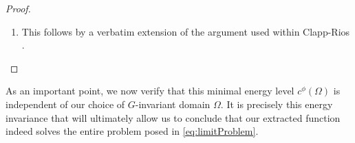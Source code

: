 \documentclass[10pt, reqno]{amsart}
\newcommand{\Om}{\Omega}
\newcommand{\abs}[1]{\left\vert #1 \right\vert}
\newcommand{\norm}[1]{\left\Vert #1 \right\Vert}
\newcommand{\D}{\mathcal{D}}
\numberwithin{equation}{section}
\theoremstyle{definition}
\theoremstyle{remark}
\theoremstyle{plain}
\begin{document}
\begin{proof}
\begin{enumerate}[leftmargin=*]
\begin{align*}
				&= t_\alpha^q \norm{u_\alpha}^q_{L^q(\Om,\abs{x}^{-bq})}\\
				&= \norm{v_\alpha}^q_{L^q(\Om,\abs{x}^{-bq})}.
			\end{align*}
			\endgroup
			In addition, by continuity of the $\D_a^{1,p}(\Om, 0)$-norm and the CKN inequality, it follows from $u_\alpha \to u$ in $\D_a^{1,p}(\Om,0)$ that $t_\alpha \to 1$, as $\alpha \to \infty$. Consequently,
			\begin{align*}
				\norm{v_\alpha - u}_{\D_a^{1,p}(\Om,0)} &\le \norm{v_\alpha - u_\alpha}_{\D_a^{1,p}(\Om,0)} + \norm{u_\alpha - u}_{\D_a^{1,p}(\Om,0)}\\
				&= \norm{t_\alpha u_\alpha - u_\alpha}_{\D_a^{1,p}(\Om,0)} + o(1)\\
				&= (t_\alpha-1)\norm{u_\alpha}_{\D_a^{1,p}(\Om,0)} + o(1)\\
				&= o(1)
			\end{align*}
			whence we infer that $v_\alpha \to u$ strongly in $\D_a^{1,p}(\Om,0)$. 
			
			\item This follows by a verbatim extension of the argument used within Clapp-Rios \cite[Lemma 2.3]{clappRios}. \qedhere
		\end{enumerate}
	\end{proof}
	
	As an important point, we now verify that this minimal energy level $c^\phi(\Om)$ is independent of our choice of $G$-invariant domain $\Om$. It is precisely this energy invariance that will ultimately allow us to conclude that our extracted function indeed solves the entire problem posed in \eqref{eq:limitProblem}.
	
\end{document}
